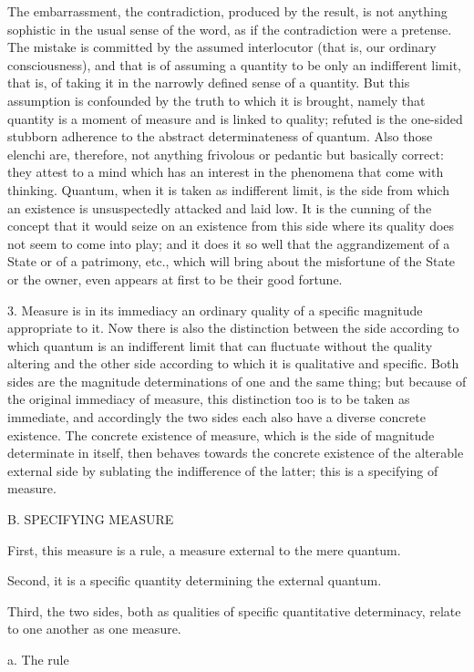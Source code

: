 The embarrassment, the contradiction, produced by the result,
is not anything sophistic in the usual sense of the word,
as if the contradiction were a pretense.
The mistake is committed by the assumed interlocutor
(that is, our ordinary consciousness),
and that is of assuming a quantity to be only an indifferent limit,
that is, of taking it in the narrowly defined sense of a quantity.
But this assumption is confounded by the truth to which it is brought,
namely that quantity is a moment of measure
and is linked to quality;
refuted is the one-sided stubborn adherence to the
abstract determinateness of quantum.
Also those elenchi are, therefore,
not anything frivolous or pedantic but basically correct:
they attest to a mind which has an interest
in the phenomena that come with thinking.
Quantum, when it is taken as indifferent limit,
is the side from which an existence is
unsuspectedly attacked and laid low.
It is the cunning of the concept
that it would seize on an existence from this side
where its quality does not seem to come into play;
and it does it so well that the aggrandizement
of a State or of a patrimony, etc.,
which will bring about the misfortune of the State or the owner,
even appears at first to be their good fortune.

3. Measure is in its immediacy an ordinary quality
of a specific magnitude appropriate to it.
Now there is also the distinction between the side
according to which quantum is an indifferent limit
that can fluctuate without the quality altering
and the other side according to which it is
qualitative and specific.
Both sides are the magnitude determinations of
one and the same thing;
but because of the original immediacy of measure,
this distinction too is to be taken as immediate,
and accordingly the two sides each also have
a diverse concrete existence.
The concrete existence of measure,
which is the side of magnitude determinate in itself,
then behaves towards the concrete existence
of the alterable external side by sublating
the indifference of the latter;
this is a specifying of measure.

B. SPECIFYING MEASURE

First, this measure is a rule,
a measure external to the mere quantum.

Second, it is a specific quantity
determining the external quantum.

Third, the two sides, both as qualities
of specific quantitative determinacy,
relate to one another as one measure.

a. The rule

